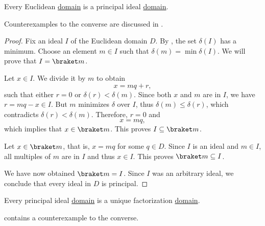 \begin{proposition}\label{thm:euclidean_domain_is_pid}
  Every Euclidean \hyperref[def:euclidean_domain]{domain} is a principal ideal \hyperref[def:principal_ideal_domain]{domain}.

  Counterexamples to the converse are discussed in \cite{Anderson1988}.
\end{proposition}
\begin{proof}
  Fix an ideal \( I \) of the Euclidean domain \( D \). By , the set \( \delta(I) \) has a minimum. Choose an element \( m \in I \) such that \( \delta(m) = \min \delta(I) \). We will prove that \( I = \braket m \).

  Let \( x \in I \). We divide it by \( m \) to obtain
  \begin{equation*}
    x = mq + r,
  \end{equation*}
  such that either \( r = 0 \) or \( \delta(r) < \delta(m) \). Since both \( x \) and \( m \) are in \( I \), we have \( r = mq - x \in I \). But \( m \) minimizes \( \delta \) over \( I \), thus \( \delta(m) \leq \delta(r) \), which contradicts \( \delta(r) < \delta(m) \). Therefore, \( r = 0 \) and
  \begin{equation*}
    x = mq,
  \end{equation*}
  which implies that \( x \in \braket m \). This proves \( I \subseteq \braket m \).

  Let \( x \in \braket m \), that is, \( x = mq \) for some \( q \in D \). Since \( I \) is an ideal and \( m \in I \), all multiples of \( m \) are in \( I \) and thus \( x \in I \). This proves \( \braket m \subseteq I \).

  We have now obtained \( \braket m = I \). Since \( I \) was an arbitrary ideal, we conclude that every ideal in \( D \) is principal.
\end{proof}

\begin{proposition}\label{thm:pid_is_ufd}
  Every principal ideal \hyperref[def:principal_ideal_domain]{domain} is a unique factorization \hyperref[def:unique_factorization_domain]{domain}.

   contains a counterexample to the converse.
\end{proposition}


